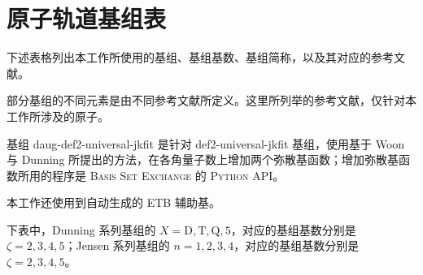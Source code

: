 
\chapter{原子轨道基组表}

下述表格列出本工作所使用的基组、基组基数、基组简称，以及其对应的参考文献。

部分基组的不同元素是由不同参考文献所定义。这里所列举的参考文献，仅针对本工作所涉及的原子。

基组 daug-def2-universal-jkfit 是针对 def2-universal-jkfit 基组，使用基于 Woon 与 Dunning 所提出的方法\cite{Woon-Dunning.JCP.1994}，在各角量子数上增加两个弥散基函数；增加弥散基函数所用的程序是 \textsc{Basis Set Exchange} 的 \textsc{Python} API\cite{Feller-Feller.JCC.1996, Schuchardt-Windus.JCIM.2007, Pritchard-Windus.JCIM.2019}。

本工作还使用到自动生成的 ETB 辅助基\cite{Stoychev-Neese.JCTC.2017}。

下表中，Dunning 系列基组的 $X = \mathrm{D, T, Q, 5}$，对应的基组基数分别是 $\zeta = 2, 3, 4, 5$；Jensen 系列基组的 $n = 1, 2, 3, 4$，对应的基组基数分别是 $\zeta = 2, 3, 4, 5$。

\begingroup
\setlength{\LTleft}{-20cm plus -1fill}
\setlength{\LTright}{\LTleft}

